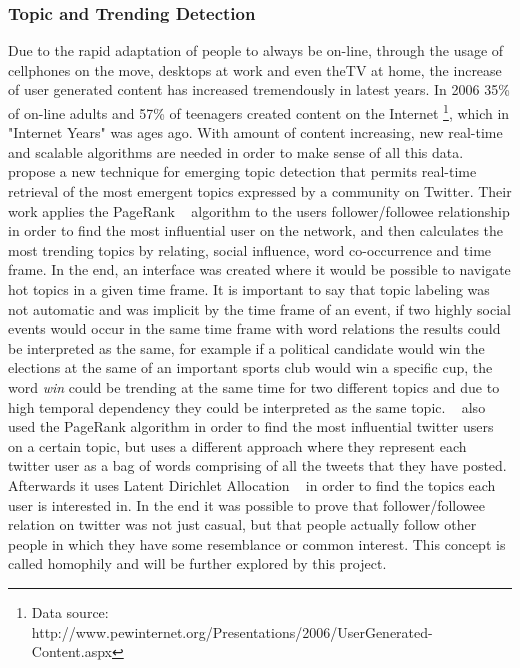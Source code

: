 \subsubsection{Topic and Trending Detection} %
\label{ssub:real_time_topic_and_trending_detection}
Due to the rapid adaptation of people to always be on-line, through the usage of cellphones on the move, desktops at work and even theTV at home, the increase of user generated content has increased tremendously in latest years. In 2006 35\% of on-line adults and 57\% of teenagers created content on the Internet \footnote{ Data source: http://www.pewinternet.org/Presentations/2006/UserGenerated-Content.aspx}, which in "Internet Years" was ages ago.
With amount of content increasing, new real-time and scalable algorithms are needed in order to make sense of all this data.
~\citet{Cataldi2010} propose a new technique for emerging topic detection that permits real-time retrieval of the most emergent topics expressed by a community on Twitter. Their work applies the PageRank ~\cite{Pagerank1998} algorithm to the users follower/followee relationship in order to find the most influential user on the network, and then calculates the most trending topics by relating, social influence, word co-occurrence and time frame. In the end, an interface was created where it would be possible to navigate hot topics in a given time frame. It is important to say that topic labeling was not automatic and was implicit by the time frame of an event, if two highly social events would occur in the same time frame with word relations the results could be interpreted as the same, for example if a political candidate would win the elections at the same of an important sports club would win a specific cup, the word \emph{win} could be trending at the same time for two different topics and due to high temporal dependency they could be interpreted as the same topic.
~\citet{Weng2010} also used the PageRank algorithm in order to find the most influential twitter users on a certain topic, but uses a different approach where they represent each twitter user as a bag of words comprising of all the tweets that they have posted. Afterwards it uses Latent Dirichlet Allocation ~\cite{Blei2003} in order to find the topics each user is interested in. In the end it was possible to prove that follower/followee relation on twitter was not just casual, but that people actually follow other people in which they have some resemblance or common interest. This concept is called homophily and will be further explored by this project.

